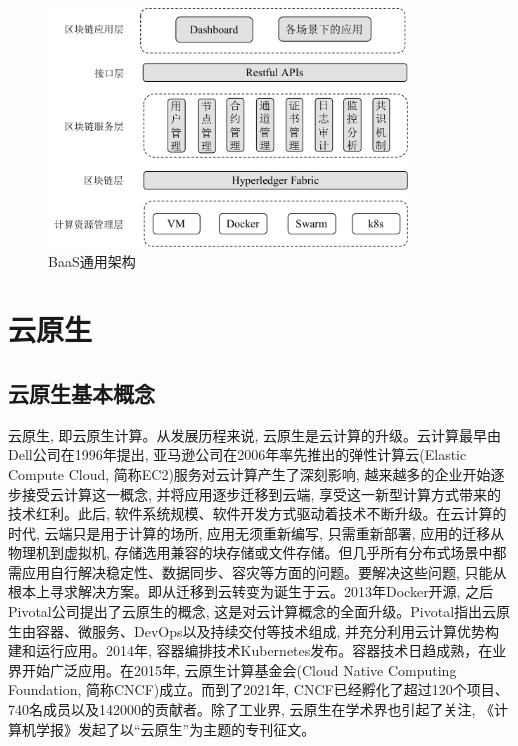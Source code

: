 \begin{figure}[h] %
    \centering %
    \includegraphics[width=0.85\textwidth]{FIGs/chapter2/BaaS_Architecture.pdf} %
    \caption{BaaS通用架构} %
    \label{BaaS_Architecture} %
\end{figure}%

\section{云原生}\label{section: cloud_native}

\subsection{云原生基本概念}

云原生, 即云原生计算。从发展历程来说, 云原生是云计算的升级。云计算最早由Dell公司在1996年提出\cite{ZHANG20121791}, 亚马逊公司在2006年率先推出的弹性计算云(Elastic Compute Cloud, 简称EC2)服务对云计算产生了深刻影响, 越来越多的企业开始逐步接受云计算这一概念, 并将应用逐步迁移到云端, 享受这一新型计算方式带来的技术红利。此后, 软件系统规模、软件开发方式驱动着技术不断升级。在云计算的时代, 云端只是用于计算的场所, 应用无须重新编写, 只需重新部署, 应用的迁移从物理机到虚拟机, 存储选用兼容的块存储或文件存储。但几乎所有分布式场景中都需应用自行解决稳定性、数据同步、容灾等方面的问题。要解决这些问题, 只能从根本上寻求解决方案。即从迁移到云转变为诞生于云。2013年Docker开源, 之后Pivotal公司提出了云原生的概念, 这是对云计算概念的全面升级。Pivotal指出云原生由容器、微服务、DevOps以及持续交付等技术\cite{WhatisCloudNative}组成, 并充分利用云计算优势构建和运行应用。2014年, 容器编排技术Kubernetes发布。容器技术日趋成熟，在业界开始广泛应用。在2015年, 
云原生计算基金会(Cloud Native Computing Foundation, 简称CNCF)成立。而到了2021年, CNCF已经孵化了超过120个项目、740名成员以及142000的贡献者\footnotemark[1]。除了工业界, 云原生在学术界也引起了关注, 《计算机学报》发起了以“云原生”为主题的专刊征文\footnotemark[2]。

